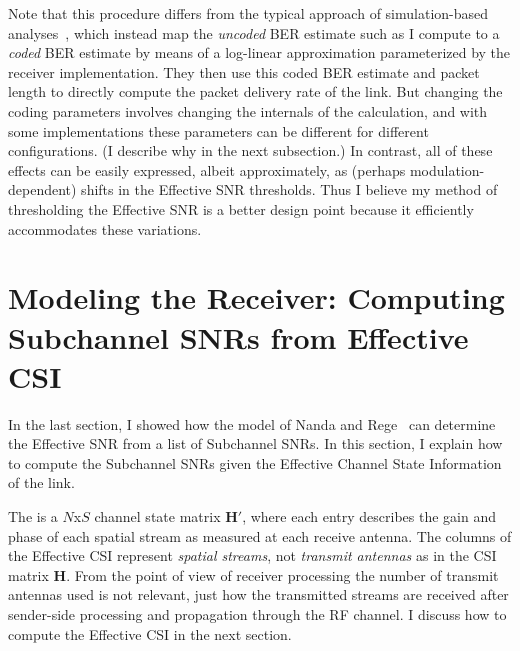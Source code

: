 Note that this procedure differs from the typical approach of simulation-based analyses~\cite{Kant_FLA, Liu_EESM, Nortel_3g}, which instead map the \emph{uncoded} BER estimate such as I compute to a \emph{coded} BER estimate by means of a log-linear approximation parameterized by the receiver implementation. They then use this coded BER estimate and packet length to directly compute the packet delivery rate of the link. But changing the coding parameters involves changing the internals of the calculation, and with some implementations these parameters can be different for different configurations. (I describe why in the next subsection.) In contrast, all of these effects can be easily expressed, albeit approximately, as (perhaps modulation-dependent) shifts in the Effective SNR thresholds. Thus I believe my method of thresholding the Effective SNR is a better design point because it efficiently accommodates these variations.


\section{Modeling the Receiver: Computing Subchannel SNRs from Effective CSI}
\label{sec:model_receiver}
In the last section, I showed how the model of Nanda and Rege~\cite{Nanda_EffectiveSNR} can determine the Effective SNR from a list of Subchannel SNRs. In this section, I explain how to compute the Subchannel SNRs given the Effective Channel State Information of the link.

The  is a $N$x$S$ channel state matrix $\mathbf{H}'$, where each entry describes the gain and phase of each spatial stream as measured at each receive antenna. The columns of the Effective CSI represent \emph{spatial streams}, not \emph{transmit antennas} as in the CSI matrix $\mathbf{H}$. From the point of view of receiver processing the number of transmit antennas used is not relevant, just how the transmitted streams are received after sender-side processing and propagation through the RF channel. I discuss how to compute the Effective CSI in the next section.

